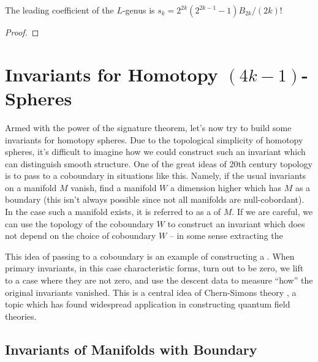 
\begin{proposition}\label{prop:leading_coefficient_L_genus}
	The leading coefficient of the $L$-genus is $s_k=2^{2k}(2^{2k-1}-1)B_{2k}/(2k)!$
\end{proposition}
\begin{proof}
\end{proof}

\pagebreak
\section{Invariants for Homotopy \texorpdfstring{${(4k-1)}$}{(4k-1)}-Spheres}\label{sec:invariants-for-homotopy-4k-1-spheres}

Armed with the power of the signature theorem, let's now try to build some invariants for homotopy spheres. 
Due to the topological simplicity of homotopy spheres, it's difficult to imagine how we could construct such an invariant which can distinguish smooth structure. One of the great ideas of 20th century topology is to pass to a coboundary in situations like this. Namely, if the usual invariants on a manifold $M$ vanish, find a manifold $W$ a dimension higher which has $M$ as a boundary (this isn't always possible since not all manifolds are null-cobordant). 
In the case such a manifold exists, it is referred to as a  of $M$. If we are careful, we can use the topology of the coboundary $W$ to construct an invariant which does not depend on the choice of coboundary $W$ -- in some sense extracting the 

\begin{remark}
	This idea of passing to a coboundary is an example of constructing a . When primary invariants, in this case characteristic forms, turn out to be zero, we lift to a case where they are not zero, and use the descent data to measure ``how'' the original invariants vanished. This is a central idea of Chern-Simons theory \cite{chernsimons1974geometric}, a topic which has found widespread application in constructing quantum field theories. 
\end{remark}

\subsection{Invariants of Manifolds with Boundary}\label{sec:relative-invariants}

